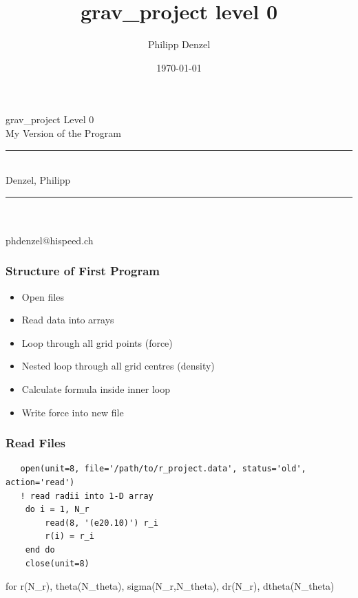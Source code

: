 \documentclass{beamer}
\title{grav\_project level 0}
\author{Philipp Denzel}
\date{\today}
\institute{Universität Zürich}
\begin{document}
\begin{frame}
 \LARGE
 \sf 	   grav\_project Level 0 \\ 
	   My Version of the Program \\

\rule{0.8\textwidth}{0.5pt} \\ %
 \Large Denzel, Philipp \\
\rule{0.8\textwidth}{0.5pt} \\  %
   \\ phdenzel@hispeed.ch \\
\end{frame}
\begin{frame}
  \frametitle{Structure of First Program}
  
  \begin{itemize}
   \item Open files
   \item Read data into arrays
   \item Loop through all grid points (force)
   \item Nested loop through all grid centres (density)
   \item Calculate formula inside inner loop
   \item Write force into new file
  \end{itemize}

\end{frame} 
\begin{frame}[fragile]
  \frametitle{Read Files}
  \begin{lstlisting}
   open(unit=8, file='/path/to/r_project.data', status='old', action='read')
   ! read radii into 1-D array
    do i = 1, N_r
        read(8, '(e20.10)') r_i
        r(i) = r_i
    end do
    close(unit=8)
  \end{lstlisting}
  
  for r(N\_r), theta(N\_theta), sigma(N\_r,N\_theta), dr(N\_r), dtheta(N\_theta)
  
\end{frame}
\end{document}
